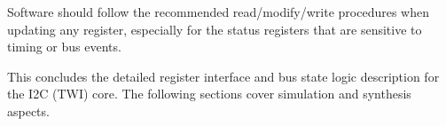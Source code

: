 Software should follow the recommended read/modify/write procedures when updating any register, especially for the
status registers that are sensitive to timing or bus events.

\bigskip

This concludes the detailed register interface and bus state logic description for the I2C (TWI) core. The following sections
cover simulation and synthesis aspects.
